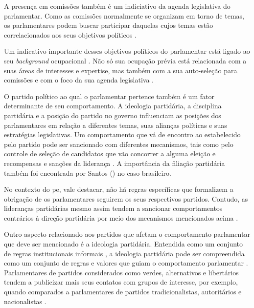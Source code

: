 A presença em comissões também é um indiciativo da agenda legislativa do parlamentar. Como as comissões normalmente se organizam em torno de temas, os parlamentares podem buscar participar daquelas cujos temas estão correlacionados aos seus objetivos políticos \cite{schiller1995senators}.

Um indicativo importante desses objetivos políticos do parlamentar está ligado ao seu \textit{background} ocupacional \cite{damgaard1980dilemma}. Não só sua ocupação prévia está relacionada com a suas áreas de interesses e expertise, mas também com a sua auto-seleção para comissões \cite{hamm2011committee, mcelroy2006committee, yordanova2009rationale} e com o foco da sua agenda legislativa \cite{burden2015personal}.

O partido político ao qual o parlamentar pertence também é um fator determinante de seu comportamento. A ideologia partidária, a disciplina partidária e a posição do partido no governo influenciam as posições dos parlamentares em relação a diferentes temas, suas alianças políticas e suas estratégias legislativas. Um comportamento que vá de encontro ao estabelecido pelo partido pode ser sancionado com diferentes mecanismos, tais como pelo controle de seleção de candidatos que vão concorrer a alguma eleição \cite{carey2007competing, hix2004electoral} e recompensas e sanções da liderança \cite{bressanelli2016impact}. A importância da filiação partidária também foi encontrada por Santos (\citeyear{santos2011parlamento}) no caso brasileiro.

No contexto do \acrshort{pe}, vale destacar, não há regras específicas que formalizem a obrigação de os parlamentares seguirem os seus respectivos partidos. Contudo, as lideranças partidárias mesmo assim tendem a sancionar comportamentos contrários à direção partidária por meio dos mecanismos mencionados acima \cite{carey2007competing, hix2004electoral, bressanelli2016impact}.

Outro aspecto relacionado aos partidos que afetam o comportamento parlamentar que deve ser mencionado é a ideologia partidária. Entendida como um conjunto de regras institucionais informais \cite{helmke2012informal}, a ideologia partidária pode ser compreendida como um conjunto de regras e valores que guiam o comportamento parlamentar \cite{hix2004electoral}. Parlamentares de partidos considerados como verdes, alternativos e libertários tendem a publicizar mais seus contatos com grupos de interesse, por exemplo, quando comparados a parlamentares de partidos tradicionalistas, autoritários e nacionalistas \cite{font_legislative_2023}.

